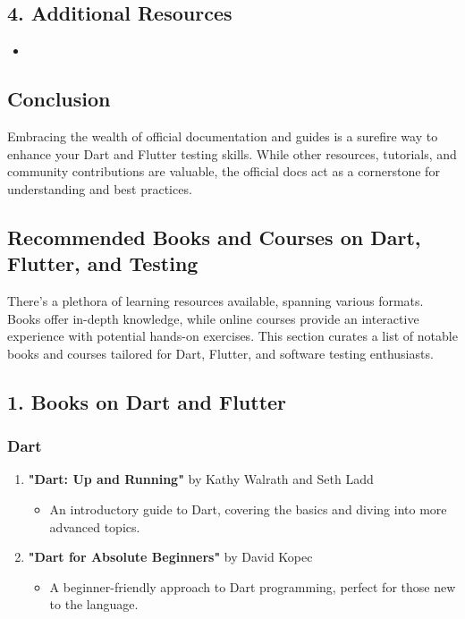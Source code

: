 \subsection*{4. Additional Resources}

\begin{itemize}
 \item {}
\end{itemize}

\subsection*{Conclusion}

Embracing the wealth of official documentation and guides is a surefire way to enhance your Dart and Flutter testing skills. While other resources, tutorials, and community contributions are valuable, the official docs act as a cornerstone for understanding and best practices.


\subsection{Recommended Books and Courses on Dart, Flutter, and Testing}

There's a plethora of learning resources available, spanning various formats. 
Books offer in-depth knowledge, while online courses provide an interactive experience with potential hands-on exercises. 
This section curates a list of notable books and courses tailored for Dart, Flutter, and software testing enthusiasts.

\subsection*{1. Books on Dart and Flutter}

\subsubsection*{Dart}

\begin{enumerate}
\item \textbf{"Dart: Up and Running"} by Kathy Walrath and Seth Ladd
\begin{itemize}
 \item An introductory guide to Dart, covering the basics and diving into more advanced topics.
\end{itemize}
 \item \textbf{"Dart for Absolute Beginners"} by David Kopec
 \begin{itemize}
  \item A beginner-friendly approach to Dart programming, perfect for those new to the language.
 \end{itemize}
\end{enumerate}

